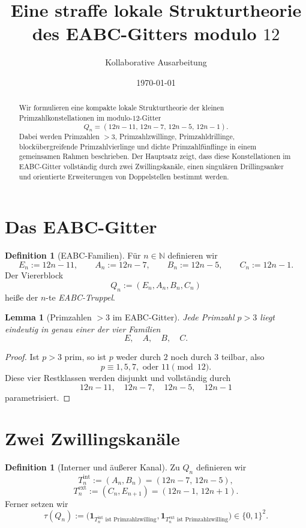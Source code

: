 \documentclass[11pt,a4paper]{article}
\title{Eine straffe lokale Strukturtheorie des EABC-Gitters modulo \(12\)}
\author{Kollaborative Ausarbeitung}
\date{\today}
\newtheorem{lemma}[satz]{Lemma}
\theoremstyle{definition}
\newtheorem{definition}[satz]{Definition}
\theoremstyle{remark}
\newcommand{\N}{\mathbb{N}}
\newcommand{\ind}{\mathbf{1}}
\begin{document}
	\maketitle
	
	\begin{abstract}
		Wir formulieren eine kompakte lokale Strukturtheorie der kleinen Primzahlkonstellationen
		im modulo-\(12\)-Gitter
		\[
		Q_n=(12n-11,\,12n-7,\,12n-5,\,12n-1).
		\]
		Dabei werden Primzahlen \(>3\), Primzahlzwillinge, Primzahldrillinge,
		blockübergreifende Primzahlvierlinge und dichte Primzahlfünflinge in einem gemeinsamen
		Rahmen beschrieben. Der Hauptsatz zeigt, dass diese Konstellationen im EABC-Gitter
		vollständig durch zwei Zwillingskanäle, einen singulären Drillingsanker und orientierte
		Erweiterungen von Doppelstellen bestimmt werden.
	\end{abstract}
	
	\section{Das EABC-Gitter}
	
	\begin{definition}[EABC-Familien]
		Für \(n\in\N\) definieren wir
		\[
		E_n:=12n-11,\qquad
		A_n:=12n-7,\qquad
		B_n:=12n-5,\qquad
		C_n:=12n-1.
		\]
		Der Viererblock
		\[
		Q_n:=(E_n,A_n,B_n,C_n)
		\]
		heiße der \(n\)-te \emph{EABC-Truppel}.
	\end{definition}
	
	\begin{lemma}[Primzahlen \(>3\) im EABC-Gitter]
		Jede Primzahl \(p>3\) liegt eindeutig in genau einer der vier Familien
		\[
		E,\quad A,\quad B,\quad C.
		\]
	\end{lemma}
	
	\begin{proof}
		Ist \(p>3\) prim, so ist \(p\) weder durch \(2\) noch durch \(3\) teilbar, also
		\[
		p\equiv 1,5,7,\text{ oder }11 \pmod{12}.
		\]
		Diese vier Restklassen werden disjunkt und vollständig durch
		\[
		12n-11,\quad 12n-7,\quad 12n-5,\quad 12n-1
		\]
		parametrisiert.
	\end{proof}
	
	\section{Zwei Zwillingskanäle}
	
	\begin{definition}[Interner und äußerer Kanal]
		Zu \(Q_n\) definieren wir
		\[
		T_n^{\mathrm{int}}:=(A_n,B_n)=(12n-7,\,12n-5),
		\]
		\[
		T_n^{\mathrm{ext}}:=(C_n,E_{n+1})=(12n-1,\,12n+1).
		\]
		Ferner setzen wir
		\[
		\tau(Q_n):=
		\bigl(
		\ind_{T_n^{\mathrm{int}}\text{ ist Primzahlzwilling}},
		\ind_{T_n^{\mathrm{ext}}\text{ ist Primzahlzwilling}}
		\bigr)\in\{0,1\}^2.
		\]
	\end{definition}
	
\end{document}
